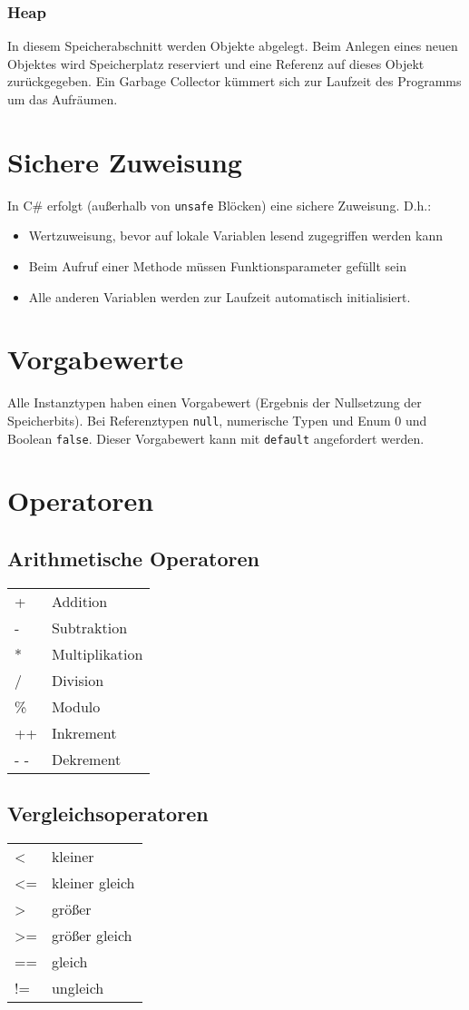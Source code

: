\subsubsection{Heap}
In diesem Speicherabschnitt werden Objekte abgelegt. Beim Anlegen eines neuen Objektes wird Speicherplatz reserviert und eine Referenz auf dieses Objekt zurückgegeben. Ein Garbage Collector kümmert sich zur Laufzeit des Programms um das Aufräumen.
\section{Sichere Zuweisung}
In C\# erfolgt (außerhalb von \texttt{unsafe} Blöcken) eine sichere Zuweisung. D.h.:
\begin{itemize}
\item Wertzuweisung, bevor auf lokale Variablen lesend zugegriffen werden kann
\item Beim Aufruf einer Methode müssen Funktionsparameter gefüllt sein
\item Alle anderen Variablen werden zur Laufzeit automatisch initialisiert.
\end{itemize}
\section{Vorgabewerte}
Alle Instanztypen haben einen Vorgabewert (Ergebnis der Nullsetzung der Speicherbits). Bei Referenztypen \texttt{null}, numerische Typen und Enum 0 und Boolean \texttt{false}. Dieser Vorgabewert kann mit \texttt{default} angefordert werden.
\section{Operatoren}
\subsection{Arithmetische Operatoren}
\begin{tabular}{p{3cm}p{5cm}}
+	&Addition\\
- 	&Subtraktion\\
* 	&Multiplikation\\
/ 	&Division\\
\%	&Modulo\\
++	&Inkrement\\
- -	&Dekrement\\
\end{tabular}
\subsection{Vergleichsoperatoren}
\begin{tabular}{p{3cm}p{5cm}}
<	&kleiner\\
<= 	&kleiner gleich\\
> 	&größer\\
>=	&größer gleich\\
==	&gleich\\
!=	&ungleich\\
\end{tabular}
